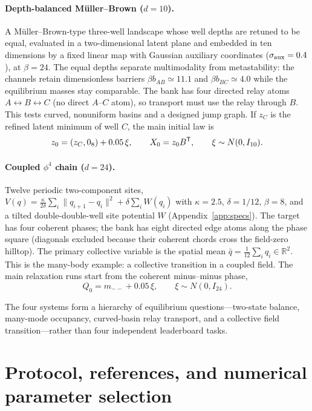 \documentclass[11pt]{article}
\newcommand{\R}{\mathbb{R}}
\begin{document}
\paragraph{Depth-balanced M\"uller--Brown ($d=10$).}
A M\"uller--Brown-type three-well landscape whose well depths are retuned to
be equal, evaluated in a two-dimensional latent plane and embedded in ten
dimensions by a fixed linear map with Gaussian auxiliary coordinates
($\sigma_{\rm aux}=0.4$), at $\beta=24$.  The equal depths separate
multimodality from metastability: the channels retain dimensionless barriers
$\beta b_{AB}\simeq11.1$ and $\beta b_{BC}\simeq4.0$ while the equilibrium
masses stay comparable.  The bank has four directed relay atoms
$A\leftrightarrow B\leftrightarrow C$ (no direct $A$--$C$ atom), so transport
must use the relay through $B$.  This tests curved, nonuniform basins and a
designed jump graph.  If $z_C$ is the refined latent minimum of well $C$, the
main initial law is
\begin{equation}
 z_0=(z_C,0_8)+0.05\,\xi,\qquad X_0=z_0B^{\sf T},
 \qquad \xi\sim N(0,I_{10}).
\end{equation}

\paragraph{Coupled $\phi^4$ chain ($d=24$).}
Twelve periodic two-component sites,
$V(q)=\tfrac{\kappa}{2\delta}\sum_i\lVert q_{i+1}-q_i\rVert^2
+\delta\sum_iW(q_i)$ with $\kappa=2.5$, $\delta=1/12$, $\beta=8$, and a tilted
double-double-well site potential $W$ (Appendix~\ref{app:specs}).  The target
has four coherent phases; the bank has eight directed edge atoms along the
phase square (diagonals excluded because their coherent chords cross the
field-zero hilltop).  The primary collective variable is the spatial mean
$\bar q=\tfrac1{12}\sum_iq_i\in\R^2$.  This is the many-body example: a
collective transition in a coupled field.  The main relaxation runs start from
the coherent minus--minus phase,
\begin{equation}
 Q_0=m_{--}+0.05\,\xi,\qquad \xi\sim N(0,I_{24}).
\end{equation}

The four systems form a hierarchy of equilibrium questions---two-state
balance, many-mode occupancy, curved-basin relay transport, and a collective
field transition---rather than four independent leaderboard tasks.

\section{Protocol, references, and numerical parameter selection}
\label{sec:protocol}
\end{document}

